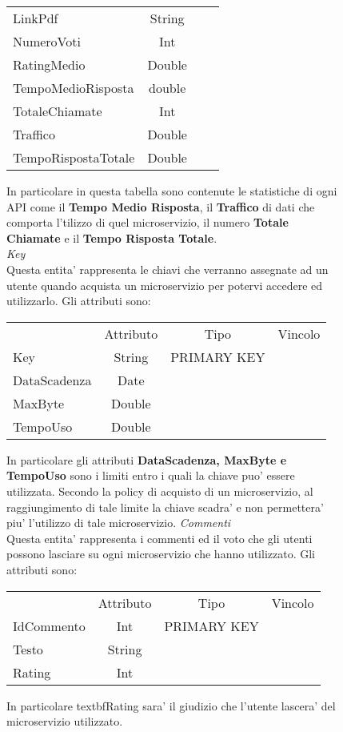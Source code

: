 {{\begin{figure}[ht]
\begin{center}
\begin{tabular}{lccc}
				LinkPdf&String& \\
				NumeroVoti&Int& \\
				RatingMedio&Double& \\
				TempoMedioRisposta&double& \\
				TotaleChiamate&Int& \\
				Traffico&Double& \\
				TempoRispostaTotale&Double& \\
			\end{tabular}
			\end{center}
			In particolare in questa tabella sono contenute le statistiche di ogni API come il \textbf{Tempo Medio Risposta}, il \textbf{Traffico} di dati che comporta l'tilizzo di quel microservizio, il numero \textbf{Totale Chiamate} e il \textbf{Tempo Risposta Totale}. \\
			\textit{Key}\\
			Questa entita' rappresenta le chiavi che verranno assegnate ad un utente quando acquista un microservizio per potervi accedere ed utilizzarlo. Gli attributi sono: \\
			\begin{center}
			\begin{tabular}{lccc}
				&Attributo&Tipo&Vincolo\\
				Key&String&PRIMARY KEY\\
				DataScadenza&Date& \\
				MaxByte&Double& \\
				TempoUso&Double& \\
			\end{tabular}
			\end{center}
			In particolare gli attributi \textbf{DataScadenza, MaxByte e TempoUso} sono i limiti entro i quali la chiave puo' essere utilizzata. Secondo la policy di acquisto di un microservizio, al raggiungimento di tale limite la chiave scadra' e non permettera' piu' l'utilizzo di tale microservizio.
			\textit{Commenti}\\
			Questa entita' rappresenta i commenti ed il voto  che gli utenti possono lasciare su ogni microservizio che hanno utilizzato. Gli attributi sono:
			\begin{center}
			\begin{tabular}{lccc}
				&Attributo&Tipo&Vincolo\\
				IdCommento&Int&PRIMARY KEY\\
				Testo&String& \\
				Rating&Int& \\
			\end{tabular}
			\end{center}
			In particolare textbf{Rating} sara' il giudizio che l'utente lascera' del microservizio utilizzato. \\
			

\end{figure}}}
